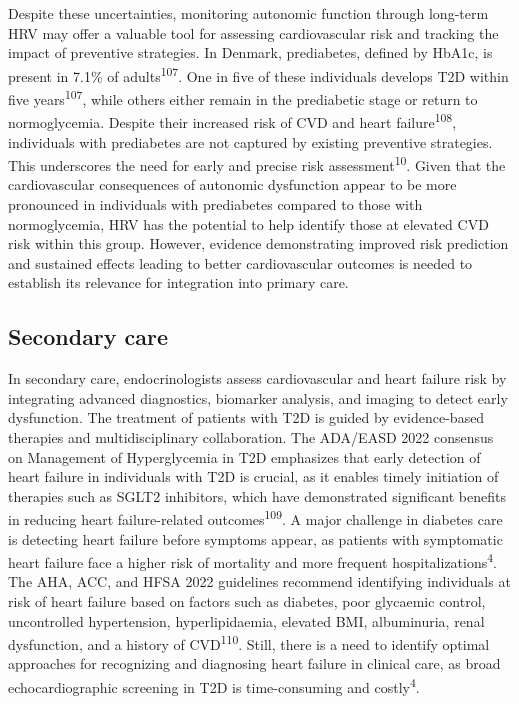 \documentclass[
  a4paper,
  headsepline=true,
  open=any]{scrbook}
\begin{document}
Despite these uncertainties, monitoring autonomic function through
long-term HRV may offer a valuable tool for assessing cardiovascular
risk and tracking the impact of preventive strategies. In Denmark,
prediabetes, defined by HbA1c, is present in 7.1\% of
adults\textsuperscript{107}. One in five of these individuals develops
T2D within five years\textsuperscript{107}, while others either remain
in the prediabetic stage or return to normoglycemia. Despite their
increased risk of CVD and heart failure\textsuperscript{108},
individuals with prediabetes are not captured by existing preventive
strategies. This underscores the need for early and precise risk
assessment\textsuperscript{10}. Given that the cardiovascular
consequences of autonomic dysfunction appear to be more pronounced in
individuals with prediabetes compared to those with normoglycemia, HRV
has the potential to help identify those at elevated CVD risk within
this group. However, evidence demonstrating improved risk prediction and
sustained effects leading to better cardiovascular outcomes is needed to
establish its relevance for integration into primary care.

\hypertarget{secondary-care}{%
\subsection{Secondary care}\label{secondary-care}}

In secondary care, endocrinologists assess cardiovascular and heart
failure risk by integrating advanced diagnostics, biomarker analysis,
and imaging to detect early dysfunction. The treatment of patients with
T2D is guided by evidence-based therapies and multidisciplinary
collaboration. The ADA/EASD 2022 consensus on Management of
Hyperglycemia in T2D emphasizes that early detection of heart failure in
individuals with T2D is crucial, as it enables timely initiation of
therapies such as SGLT2 inhibitors, which have demonstrated significant
benefits in reducing heart failure-related
outcomes\textsuperscript{109}. A major challenge in diabetes care is
detecting heart failure before symptoms appear, as patients with
symptomatic heart failure face a higher risk of mortality and more
frequent hospitalizations\textsuperscript{4}. The AHA, ACC, and HFSA
2022 guidelines recommend identifying individuals at risk of heart
failure based on factors such as diabetes, poor glycaemic control,
uncontrolled hypertension, hyperlipidaemia, elevated BMI, albuminuria,
renal dysfunction, and a history of CVD\textsuperscript{110}. Still,
there is a need to identify optimal approaches for recognizing and
diagnosing heart failure in clinical care, as broad echocardiographic
screening in T2D is time-consuming and costly\textsuperscript{4}.
\end{document}
